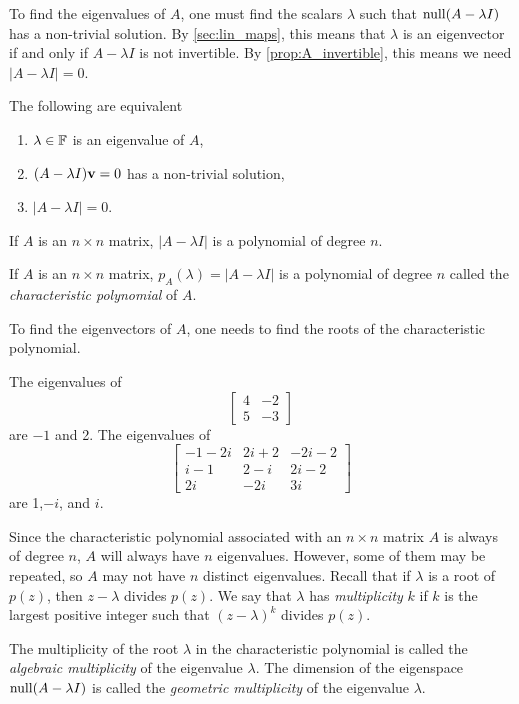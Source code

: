 \documentclass{article}
\begin{document}
To find the eigenvalues of $A$, one must find the scalars $\lambda$ such that $\operatorname{null} (A - \lambda I)$ has a non-trivial solution. By \cref{sec:lin_maps}, this means that $\lambda$ is an eigenvector if and only if $A - \lambda I$ is not invertible. By \cref{prop:A_invertible}, this means we need $|A - \lambda I| = 0$.

\begin{theorem}
The following are equivalent
\begin{enumerate}
    \item $\lambda\in {\mathbb{F}}$ is an eigenvalue of $A$,
    \item $(A-\lambda I){\mathbf{v}} = 0$ has a non-trivial solution,
    \item $|A-\lambda I|= 0$.
\end{enumerate}
\end{theorem}

If $A$ is an $n \times n$ matrix, $|A - \lambda I|$ is a polynomial of degree $n$. 
\begin{definition}
If $A$ is an $n\times n$ matrix, $p_A(\lambda) = |A-\lambda I|$ is a polynomial of degree $n$ called the \emph{characteristic polynomial} of $A$.
\end{definition}

To find the eigenvectors of $A$, one needs to find the roots of the characteristic polynomial.

\begin{example}
The eigenvalues of 
$$ \begin{bmatrix} 4 & -2 \\ 5 & -3 \end{bmatrix}$$
are $-1$ and 2.
The eigenvalues of 
$$ \begin{bmatrix} -1-2i & 2i+2 &-2i-2\\ i-1 & 2-i &2i-2\\ 2i &-2i & 3i \end{bmatrix}$$
are 1,$-i$, and $i$.
\end{example}

Since the characteristic polynomial associated with an $n \times n$ matrix $A$ is always of degree $n$, $A$ will always have $n$ eigenvalues. However, some of them may be repeated, so $A$ may not have $n$ distinct eigenvalues. 
Recall that if $\lambda$ is a root of $p(z)$, then $z - \lambda$ divides $p(z)$. We say that $\lambda$ has \emph{multiplicity} $k$ if $k$ is the largest positive integer such that $(z - \lambda)^k$ divides $p(z)$. 

\begin{definition}
The multiplicity of the root $\lambda$ in the characteristic polynomial is called the \emph{algebraic multiplicity} of the eigenvalue $\lambda$. The dimension of the eigenspace $\operatorname{null} (A - \lambda I)$ is called the \emph{geometric multiplicity} of the eigenvalue $\lambda$.
\end{definition}
\end{document}
